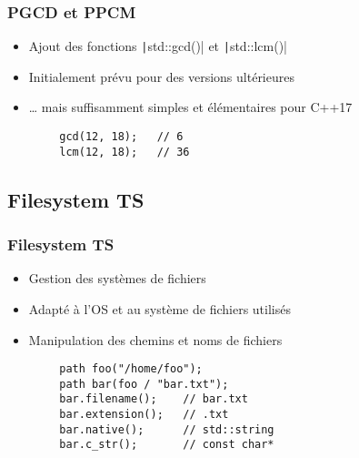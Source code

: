 \documentclass[C++.tex]{subfiles}
\begin{document}
\begin{frame}[fragile]
	\frametitle{PGCD et PPCM}
	\begin{itemize}
		\item Ajout des fonctions \texttt|std::gcd()| et \texttt|std::lcm()|
		\item Initialement prévu pour des versions ultérieures
		\item \ldots{} mais suffisamment simples et élémentaires pour C++17
	\end{itemize}

	\begin{verbatim}
		gcd(12, 18);   // 6
		lcm(12, 18);   // 36
	\end{verbatim}


\end{frame}

\subsection*{Filesystem TS}
\begin{frame}[fragile]
	\frametitle{Filesystem TS}
	\begin{itemize}
		\item Gestion des systèmes de fichiers
		\item Adapté à l'OS et au système de fichiers utilisés
		\item Manipulation des chemins et noms de fichiers
	\end{itemize}

	\begin{verbatim}
		path foo("/home/foo");
		path bar(foo / "bar.txt");
		bar.filename();    // bar.txt
		bar.extension();   // .txt
		bar.native();      // std::string
		bar.c_str();       // const char*
	\end{verbatim}

\end{frame}
\end{document}
